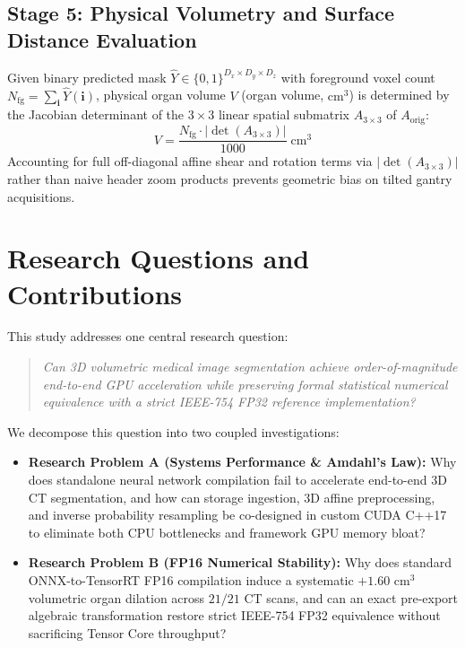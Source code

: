 \documentclass[10pt,twocolumn]{article}
\begin{document}
\subsection{Stage 5: Physical Volumetry and Surface Distance Evaluation}
Given binary predicted mask $\hat{Y} \in \{0, 1\}^{D_x \times D_y \times D_z}$ with foreground voxel count $N_{\text{fg}} = \sum_{\mathbf{i}} \hat{Y}(\mathbf{i})$, physical organ volume $V$ (organ volume, $\text{cm}^3$) is determined by the Jacobian determinant of the $3 \times 3$ linear spatial submatrix $A_{3\times 3}$ of $A_{\text{orig}}$:
\begin{equation}
    V = \frac{N_{\text{fg}} \cdot \lvert \det(A_{3\times 3}) \rvert}{1000}\;\text{cm}^3
    \label{eq:volume}
\end{equation}
Accounting for full off-diagonal affine shear and rotation terms via $\lvert\det(A_{3\times 3})\rvert$ rather than naive header zoom products prevents geometric bias on tilted gantry acquisitions.

\section{Research Questions and Contributions}
\label{sec:questions}

This study addresses one central research question:
\begin{quote}
\textit{Can 3D volumetric medical image segmentation achieve order-of-magnitude end-to-end GPU acceleration while preserving formal statistical numerical equivalence with a strict IEEE-754 FP32 reference implementation?}
\end{quote}
We decompose this question into two coupled investigations:
\begin{itemize}
    \item \textbf{Research Problem A (Systems Performance \& Amdahl's Law):} Why does standalone neural network compilation fail to accelerate end-to-end 3D CT segmentation, and how can storage ingestion, 3D affine preprocessing, and inverse probability resampling be co-designed in custom CUDA C++17 to eliminate both CPU bottlenecks and framework GPU memory bloat?
    \item \textbf{Research Problem B (FP16 Numerical Stability):} Why does standard ONNX-to-TensorRT FP16 compilation induce a systematic $+1.60\text{ cm}^3$ volumetric organ dilation across $21/21$ CT scans, and can an exact pre-export algebraic transformation restore strict IEEE-754 FP32 equivalence without sacrificing Tensor Core throughput?
\end{itemize}
\end{document}
